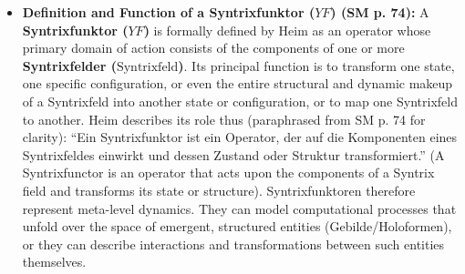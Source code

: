 \documentclass[12pt]{article}
\newcommand{\q}[1]{\enquote{#1}}
\newcommand{\syntrixfeld}{\text{Syntrixfeld}}
\newcommand{\syntrixfunktor}{YF}
\begin{document}
\begin{itemize}
    \item \textbf{Definition and Function of a Syntrixfunktor (\(\syntrixfunktor\)) (SM p. 74):}
    A \textbf{Syntrixfunktor (\(\syntrixfunktor\))} is formally defined by Heim as an operator whose primary domain of action consists of the components of one or more \textbf{Syntrixfelder (\(\syntrixfeld\))}. Its principal function is to transform one state, one specific configuration, or even the entire structural and dynamic makeup of a Syntrixfeld into another state or configuration, or to map one Syntrixfeld to another. Heim describes its role thus (paraphrased from SM p. 74 for clarity): \q{Ein Syntrixfunktor ist ein Operator, der auf die Komponenten eines Syntrixfeldes einwirkt und dessen Zustand oder Struktur transformiert.} (A Syntrixfunctor is an operator that acts upon the components of a Syntrix field and transforms its state or structure). Syntrixfunktoren therefore represent meta-level dynamics. They can model computational processes that unfold over the space of emergent, structured entities (Gebilde/Holoformen), or they can describe interactions and transformations between such entities themselves.


\end{itemize}
\end{document}
